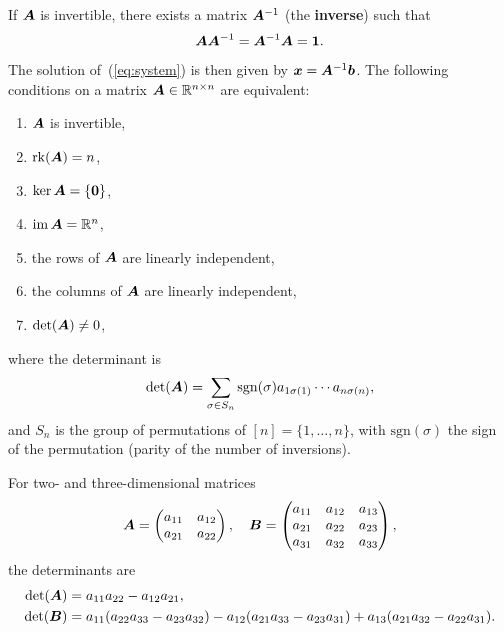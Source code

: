 \documentclass[11pt,a4paper]{memoir}
\begin{document}
If $\bm{A}$ is invertible, there exists a matrix $\bm{A}^{-1}$ (the \textbf{inverse}) such that
\begin{equation*}
  \bm{A} \bm{A}^{-1} = \bm{A}^{-1}\bm{A} = \bm{1}.
\end{equation*}
The solution of~(\ref{eq:system}) is then given by $\bm{x} = \bm{A}^{-1} \bm{b}$.
The following conditions on a matrix $\bm{A}\in \mathbb{R}^{n\times n}$ are equivalent:
\begin{enumerate}
\item $\bm{A}$ is invertible,
\item $\mathrm{rk}(\bm{A})= n$,
\item $\ker \bm{A} = \{\bm{0}\}$,
\item $\operatorname{im} \bm{A} = \mathbb{R}^n$,
\item the rows of $\bm{A}$ are linearly independent,
\item the columns of $\bm{A}$ are linearly independent,
\item $\det(\bm{A})\neq 0$,
\end{enumerate}
where the determinant is
\begin{equation*}
 \det(\bm{A}) = \sum_{\sigma \in S_n} \mathrm{sgn}(\sigma) a_{1\sigma(1)}\cdots a_{n\sigma(n)},
\end{equation*}
and $S_n$ is the group of permutations of $[n]=\{1,\dots,n\}$, 
with $\mathrm{sgn}(\sigma)$ the sign of the permutation (parity of the number of inversions).
\begin{example}
 For two- and three-dimensional matrices
 \begin{equation*}
 \bm{A}=\begin{pmatrix} a_{11} & a_{12}\\ a_{21} & a_{22}\end{pmatrix}, \quad \bm{B} = \begin{pmatrix} a_{11} & a_{12} & a_{13}\\ a_{21} & a_{22} & a_{23}\\ a_{31} & a_{32} & a_{33}\end{pmatrix},
 \end{equation*}
 the determinants are
 \begin{align*}
   \det(\bm{A})&= a_{11}a_{22}-a_{12}a_{21}, \\
  \det(\bm{B}) &= a_{11}(a_{22}a_{33}-a_{23}a_{32})-a_{12}(a_{21}a_{33}-a_{23}a_{31})+a_{13}(a_{21}a_{32}-a_{22}a_{31}).
 \end{align*}
\end{example}
\end{document}
